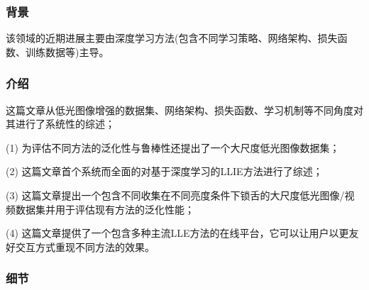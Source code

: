 \documentclass[letterpaper,12pt]{article}
\begin{document}
	\subsubsection{背景}
	
	该领域的近期进展主要由深度学习方法(包含不同学习策略、网络架构、损失函数、训练数据等)主导。
	
	\subsubsection{介绍}
	
	这篇文章从低光图像增强的数据集、网络架构、损失函数、学习机制等不同角度对其进行了系统性的综述；
	
	(1) 为评估不同方法的泛化性与鲁棒性还提出了一个大尺度低光图像数据集；
	
	(2) 这篇文章首个系统而全面的对基于深度学习的LLIE方法进行了综述；
	
	(3) 这篇文章提出一个包含不同收集在不同亮度条件下锁舌的大尺度低光图像/视频数据集并用于评估现有方法的泛化性能；
	
	(4) 这篇文章提供了一个包含多种主流LLE方法的在线平台，它可以让用户以更友好交互方式重现不同方法的效果。
	
	
	\subsubsection{细节}
	
	\renewcommand{\tablename}{Table}
	
\end{document}
